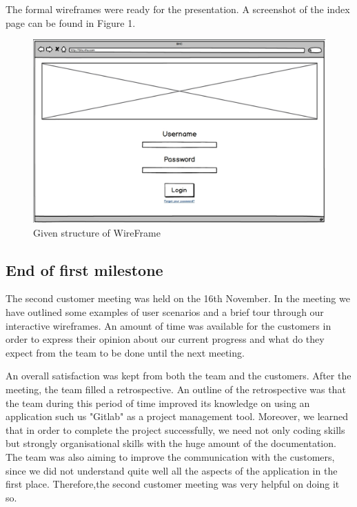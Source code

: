 \documentclass{l3proj}
\begin{document}
The formal wireframes were ready for the presentation. A screenshot of the index page can be found in Figure 1.

\begin{figure}
  \centerline{\includegraphics[width=\textwidth, height=\textheight, keepaspectratio]{wireframe.png}}
  \caption{Given structure of WireFrame}
  \label{fig:initialWireframe}
\end{figure}



\subsection{End of first milestone}
\label{sec:milestone1}

The second customer meeting was held on the 16th November. In the meeting we have outlined some examples of user scenarios and a brief tour through our interactive wireframes. An amount of time was available for the customers in order to express their opinion about our current progress and what do they expect from the team to be done until the next meeting.

An overall satisfaction was kept from both the team and the customers. After the meeting, the team filled a retrospective. An outline of the retrospective was that the team during this period of time improved its knowledge on using an application such us "Gitlab" as a project management tool. Moreover, we learned that in order to complete the project successfully, we need not only coding skills but strongly organisational skills with the huge amount of the documentation. The team was also aiming to improve the communication with the customers, since we did not understand quite well all the aspects of the application in the first place. Therefore,the second customer meeting was very helpful on doing it so.
\end{document}
